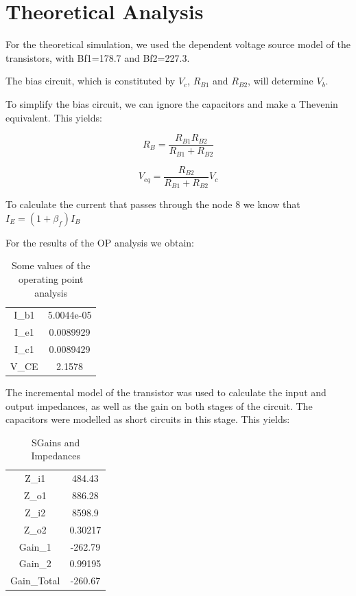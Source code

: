 \section{Theoretical Analysis}
\label{sec:analysis}

For the theoretical simulation, we used the dependent voltage source model of the transistors, with Bf1=178.7 and Bf2=227.3.

The bias circuit, which is constituted by $V_c$, $R_{B1}$ and $R_{B2}$, will determine $V_b$.

To simplify the bias circuit, we can ignore the capacitors and make a Thevenin equivalent. This yields:

\begin{equation}
	R_B=\frac{R_{B1} R_{B2}}{R_{B1}+R_{B2}}
\end{equation}

\begin{equation}
	V_{eq}= \frac{R_{B2}}{R_{B1}+R_{B2}} V_{c}
\end{equation}

To calculate the current that passes through the node 8 we know that $I_E= (1+\beta_f)I_B$

For the results of the OP analysis we obtain:

\begin{table}[H]
    \addtolength{\tabcolsep}{-4pt}
    \caption{Some values of the operating point analysis}
    \vspace{-3mm}
    \begin{tabular}{|c|c|}
    \hline
    I_{b1} &  5.0044e-05\\
    I_{e1} &  0.0089929\\
    I_{c1} &  0.0089429  \\ 
    V_{CE} &  2.1578\\

    
    \hline
    \end{tabular}
    \label{tab:OP_mat}
\end{table}

The incremental model of the transistor was used to calculate the input and output impedances, as well as
the gain on both stages of the circuit. The capacitors were modelled as short circuits in this stage. This yields:

\begin{table}[H]
    \addtolength{\tabcolsep}{-4pt}
    \caption{SGains and Impedances}
    \vspace{-3mm}
    \begin{tabular}{|c|c|}
    \hline
    Z_{i1} &  484.43\\
    Z_{o1} &  886.28\\
    Z_{i2} &  8598.9\\
    Z_{o2} &  0.30217\\
    Gain_1 & -262.79\\
    Gain_2 &  0.99195\\
    Gain_{Total} & -260.67\\   
    \hline
    \end{tabular}
    \label{tab:Z_mat}
\end{table}

